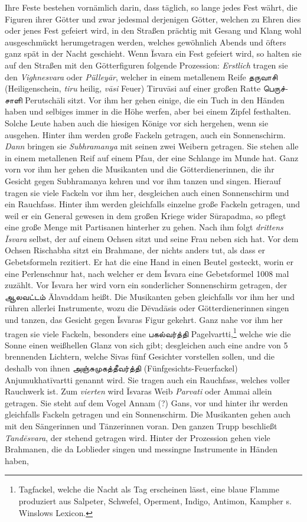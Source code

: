 \documentclass{article}
\newcommand{\TamilText}[1]{\texttamil{#1}}
\newcommand{\tam}[1]{\TamilText{#1}}
\begin{document}
Ihre Feste bestehen vornämlich darin, dass täglich, so lange jedes Fest währt, die Figuren ihrer Götter und zwar jedesmal derjenigen Götter, welchen zu Ehren dies oder jenes Fest gefeiert wird, in den Straßen prächtig mit Gesang und Klang wohl ausgeschmückt herumgetragen werden, welches gewöhnlich Abends und öfters ganz spät in der Nacht geschieht. Wenn \={I}svara ein Fest gefeiert wird, so halten sie auf den Straßen mit den Götterfiguren folgende Prozession: \emph{Erstlich} tragen sie den \emph{Vighnesvara} oder \emph{Pülley\={a}r}, welcher in einem metallenem Reife \tam{தருவாசி} (Heiligenschein, \emph{tiru} heilig, \emph{v\={a}si} Feuer) Tiruv\={a}si auf einer großen Ratte \tam{பெருச்சாளி} Perutsch\={a}li sitzt. Vor ihm her gehen einige, die ein Tuch in den Händen haben und selbiges immer in die Höhe werfen, aber bei einem Zipfel festhalten. Solche Leute haben auch die hiesigen Könige vor sich hergehen, wenn sie ausgehen. Hinter ihm werden große Fackeln getragen, auch ein Sonnenschirm. \emph{Dann} bringen sie \emph{Subhramanya} mit seinen zwei Weibern getragen. Sie stehen alle in einem metallenen Reif auf einem Pfau, der eine Schlange im Munde hat. Ganz vorn vor ihm her gehen die Musikanten und die Götterdienerinnen, die ihr Gesicht gegen Subhramanya kehren und vor ihm tanzen und singen. Hierauf tragen sie viele Fackeln vor ihm her, desgleichen auch einen Sonnenschirm und ein Rauchfass. Hinter ihm werden gleichfalls einzelne große Fackeln getragen, und weil er ein General gewesen in dem großen Kriege wider S\={u}rapadma, so pflegt eine große Menge mit Partisanen hinterher zu gehen. Nach ihm folgt \emph{drittens \={I}svara} selbst, der auf einem Ochsen sitzt und seine Frau neben sich hat. Vor dem Ochsen Rischabha sitzt ein Brahmane, der nichts anders tut, als dass er Gebetsformeln rezitiert. Er hat die eine Hand in einen Beutel gesteckt, worin er eine Perlenschnur hat, nach welcher er dem \={I}svara eine Gebetsformel 1008 mal zuzählt. Vor \={I}svara her wird vorn ein sonderlicher Sonnenschirm getragen, der \tam{ஆலவட்டம்} \={A}lavaddam heißt. Die Musikanten geben gleichfalls vor ihm her und rühren allerlei Instrumente, wozu die D\={e}vad\={a}sis oder Götterdienerinnen singen und tanzen, das Gesicht gegen \={I}svaras Figur gekehrt. Ganz nahe vor ihm her tragen sie viele Fackeln, besonders eine \tam{பகல்வர்த்தி} Pagelvartti,\footnote{Tagfackel, welche die Nacht als Tag erscheinen lässt, eine blaue Flamme produziert aus Salpeter, Schwefel, Operment, Indigo, Antimon, Kampher s. Winslows Lexicon.} welche wie die Sonne einen weißhellen Glanz von sich gibt; desgleichen auch eine andre von 5 brennenden Lichtern, welche Sivas fünf Gesichter vorstellen sollen, und die deshalb von ihnen \tam{அஞ்சுமுகத்தீவர்த்தி} (Fünfgesichts-Feuerfackel) Anjumukhat\={i}vartti genannt wird. Sie tragen auch ein Rauchfass, welches voller Rauchwerk ist. Zum \emph{vierten} wird \={I}svaras Weib \emph{Parvati} oder Ammai allein getragen. Sie steht auf dem Vogel Annam (?) Gans, vor und hinter ihr werden gleichfalls Fackeln getragen und ein Sonnenschirm. Die Musikanten gehen auch mit den Sängerinnen und Tänzerinnen voran. Den ganzen Trupp beschließt \emph{Tand\={e}svara}, der stehend getragen wird. Hinter der Prozession gehen viele Brahmanen, die da Loblieder singen und messingne Instrumente in Händen haben, 
\end{document}
